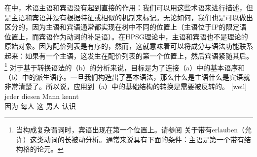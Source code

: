 在\gbtc 中，术语主语和宾语没有起到直接的作用：我们可以用这些术语来进行描述，但是主语和宾语并没有根据特征或相似的机制来标记。无论如何，我们也是可以做出区分的，因为主语和宾语通常都实现在树中不同的位置上（主语位于IP的限定语位置上，而宾语作为动词的补足语）。在HPSG理论中，主语和宾语也不是理论的原始对象。因为配价列表是有序的，然而，这就意味着可以将\argstc 成分与语法功能联系起来：如果有一个主语，这发生在配价列表的第一个位置上，然后宾语紧随其后。\footnote{%
当构成复杂谓词时，宾语出现在第一个位置上。请参阅 关于带有erlauben（允许）这类动词的长被动分析。通常来说具有下面的条件：主语是第一个带有结构格的论元。
} 
对于基于转换语法的（b）的分析来说，目标是为了连接（a）中的基本语序和（b）中的派生语序。一旦我们构造出了基本语法，那么什么是主语什么是宾语就非常清楚了。所以说，应用到（a）中的基础结构的转换是需要被反转的。
\eal
\ex 
\gll {}[weil] jeder diesen Mann kennt\\
	 {}\spacebr{}因为 每人 这 男人 认识\\
